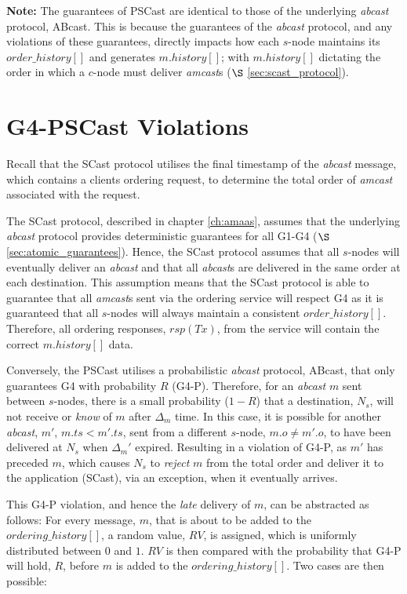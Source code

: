 \textbf{Note: } The guarantees of \textsf{PSCast} are identical to those of the underlying \emph{abcast} protocol, \textsf{ABcast}.  This is because the guarantees of the \emph{abcast} protocol, and any violations of these guarantees, directly impacts how each $s$-node maintains its $order\_history[]$ and generates $m.history[]$; with $m.history[]$ dictating the order in which a $c$-node must deliver \emph{amcast}s ($\S$ \ref{sec:scast_protocol}).  

\section{G4-PSCast Violations}
Recall that the \textsf{SCast} protocol utilises the final timestamp of the \emph{abcast} message, which contains a clients ordering request, to determine the total order of \emph{amcast} associated with the request.  

The \textsf{SCast} protocol, described in chapter \ref{ch:amaas}, assumes that the underlying \emph{abcast} protocol provides deterministic guarantees for all G1-G4 ($\S$ \ref{sec:atomic_guarantees}).  Hence, the \textsf{SCast} protocol assumes that all $s$-nodes will eventually deliver an \emph{abcast} and that all \emph{abcast}s are delivered in the same order at each destination.  This assumption means that the \textsf{SCast} protocol is able to guarantee that all \emph{amcast}s sent via the ordering service will respect G4 as it is guaranteed that all $s$-nodes will always maintain a consistent $order\_history[]$.  Therefore, all ordering responses, $rsp(Tx)$, from the service will contain the correct $m.history[]$ data.  

Conversely, the \textsf{PSCast} utilises a probabilistic \emph{abcast} protocol, \textsf{ABcast}, that only guarantees G4 with probability $R$ (G4-P).  Therefore, for an \emph{abcast} $m$ sent between $s$-nodes, there is a small probability ($1-R$) that a destination, $N_s$, will not receive or \emph{know} of $m$ after $\Delta_m$ time.  In this case, it is possible for another \emph{abcast}, $m'$, $m.ts < m'.ts$, sent from a different $s$-node, $m.o \neq m'.o$, to have been delivered at $N_s$ when $\Delta_m'$ expired.  Resulting in a violation of G4-P, as $m'$ has preceded $m$, which causes $N_s$ to \emph{reject} $m$ from the total order and deliver it to the application (\textsf{SCast}), via an exception, when it eventually arrives.  

This G4-P violation, and hence the \emph{late} delivery of $m$, can be abstracted as follows: For every message, $m$, that is about to be added to the $ordering\_history[]$, a random value, $RV$, is assigned, which is uniformly distributed between $0$ and $1$.  $RV$ is then compared with the probability that G4-P will hold, $R$, before $m$ is added to the $ordering\_history[]$. Two cases are then possible:

